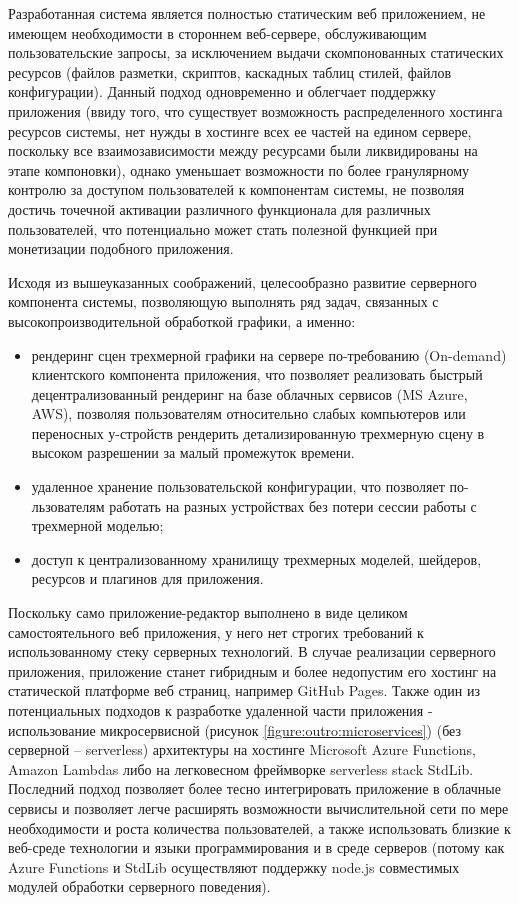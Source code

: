 Разработанная система является полностью статическим веб приложением, не имеющем необходимости в стороннем веб-сервере, обслуживающим пользовательские запросы, за исключением выдачи скомпонованных
статических ресурсов (файлов разметки, скриптов, каскадных таблиц стилей, файлов конфигурации). Данный подход одновременно и облегчает поддержку приложения (ввиду того, что существует возможность
распределенного хостинга ресурсов системы, нет нужды в хостинге всех ее частей на едином сервере, поскольку все взаимозависимости между ресурсами были ликвидированы на этапе компоновки), однако
уменьшает возможности по более гранулярному контролю за доступом пользователей к компонентам системы, не позволяя достичь точечной активации различного функционала для различных пользователей, что
потенциально может стать полезной функцией при монетизации подобного приложения.

Исходя из вышеуказанных соображений, целесообразно развитие серверного компонента системы, позволяющую выполнять ряд задач, связанных с высокопроизводительной обработкой графики, а именно:
\begin{itemize}
\item рендеринг сцен трехмерной графики на сервере по-требованию (On-demand) клиентского компонента приложения, что позволяет реализовать быстрый децентрализованный рендеринг на базе облачных
сервисов (MS Azure, AWS), позволяя пользователям относительно слабых компьютеров или переносных у-стройств рендерить детализированную трехмерную сцену в высоком разрешении за малый промежуток
времени.
\item удаленное хранение пользовательской конфигурации, что позволяет по-льзователям работать на разных устройствах без потери сессии работы с трехмерной моделью;
\item доступ к централизованному хранилищу трехмерных моделей, шейдеров, ресурсов и плагинов для приложения.
\end{itemize}

Поскольку само приложение-редактор выполнено в виде целиком самостоятельного веб приложения, у него нет строгих требований к использованному стеку серверных технологий. В случае реализации
серверного приложения, приложение станет гибридным и более недопустим его хостинг на статической платформе веб страниц, например GitHub Pages. Также один из потенциальных подходов к разработке
удаленной части приложения - использование микросервисной (рисунок \ref{figure:outro:microservices}) (без серверной -- serverless) архитектуры на хостинге Microsoft Azure Functions, Amazon Lambdas либо на легковесном фреймворке 
serverless stack StdLib. Последний подход позволяет более тесно интегрировать приложение в облачные сервисы и позволяет легче расширять возможности вычислительной сети по мере необходимости и
роста количества пользователей, а также использовать близкие к веб-среде технологии и языки программирования и в среде серверов (потому как Azure Functions и StdLib осуществляют поддержку node.js
совместимых модулей обработки серверного поведения).

